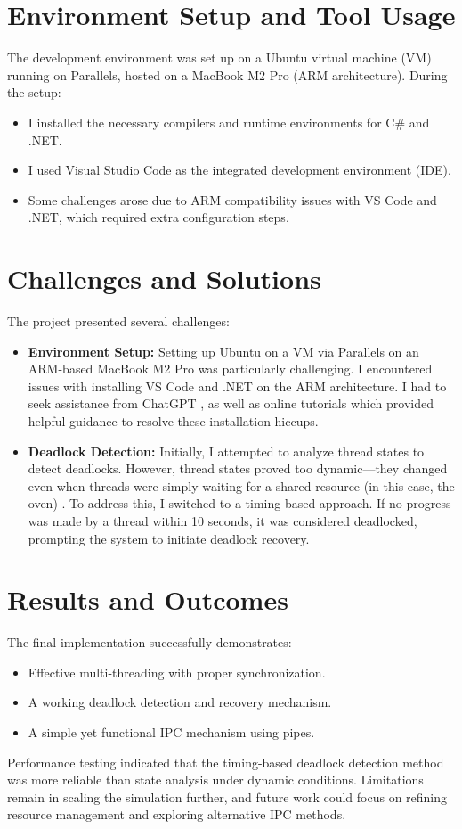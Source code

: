 \documentclass[12pt]{article}
\begin{document}
\section{Environment Setup and Tool Usage}
The development environment was set up on a Ubuntu virtual machine (VM) running on Parallels, hosted on a MacBook M2 Pro (ARM architecture). During the setup:
\begin{itemize}
    \item I installed the necessary compilers and runtime environments for C\# and .NET.
    \item I used Visual Studio Code as the integrated development environment (IDE).
    \item Some challenges arose due to ARM compatibility issues with VS Code and .NET, which required extra configuration steps.
\end{itemize}

\section{Challenges and Solutions}
The project presented several challenges:
\begin{itemize}
    \item \textbf{Environment Setup:} Setting up Ubuntu on a VM via Parallels on an ARM-based MacBook M2 Pro was particularly challenging. I encountered issues with installing VS Code and .NET on the ARM architecture. I had to seek assistance from ChatGPT \cite{ChatGPT}, as well as online tutorials \cite{UbuntuARM} which provided helpful guidance to resolve these installation hiccups.
    \item \textbf{Deadlock Detection:} Initially, I attempted to analyze thread states to detect deadlocks. However, thread states proved too dynamic—they changed even when threads were simply waiting for a shared resource (in this case, the oven) \cite{CSharpThreading}. To address this, I switched to a timing-based approach. If no progress was made by a thread within 10 seconds, it was considered deadlocked, prompting the system to initiate deadlock recovery.
\end{itemize}

\section{Results and Outcomes}
The final implementation successfully demonstrates:
\begin{itemize}
    \item Effective multi-threading with proper synchronization.
    \item A working deadlock detection and recovery mechanism.
    \item A simple yet functional IPC mechanism using pipes.
\end{itemize}
Performance testing indicated that the timing-based deadlock detection method was more reliable than state analysis under dynamic conditions. Limitations remain in scaling the simulation further, and future work could focus on refining resource management and exploring alternative IPC methods.
\end{document}
